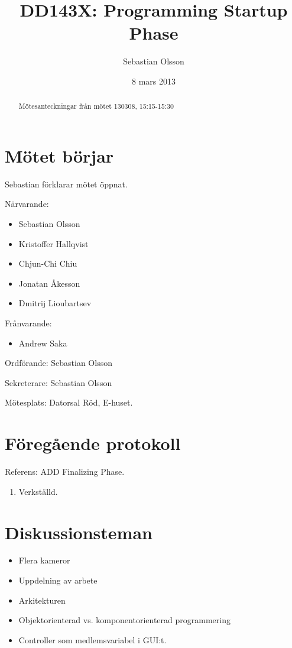 \documentclass[a4paper,12pt]{article}
\author{Sebastian Olsson}
\title{DD143X: Programming Startup Phase}
\date{8 mars 2013}
\begin{document}
\maketitle
\begin{abstract}
    Mötesanteckningar från mötet 130308, 15:15-15:30
\end{abstract}

\section{Mötet börjar}
Sebastian förklarar mötet öppnat.

Närvarande:
\begin{itemize}
\item Sebastian Olsson
\item Kristoffer Hallqvist
\item Chjun-Chi Chiu
\item Jonatan Åkesson
\item Dmitrij Lioubartsev
\end{itemize}
Frånvarande:
\begin{itemize}
\item Andrew Saka
\end{itemize}

Ordförande: Sebastian Olsson

Sekreterare: Sebastian Olsson

Mötesplats: Datorsal Röd, E-huset.

\section{Föregående protokoll}
Referens: ADD Finalizing Phase.

\begin{enumerate}
\item Verkställd.
\end{enumerate}

\section{Diskussionsteman}
\begin{itemize}
\item Flera kameror
\item Uppdelning av arbete
\item Arkitekturen
\item Objektorienterad vs. komponentorienterad programmering
\item Controller som medlemsvariabel i GUI:t.
\end{itemize}
\end{document}
